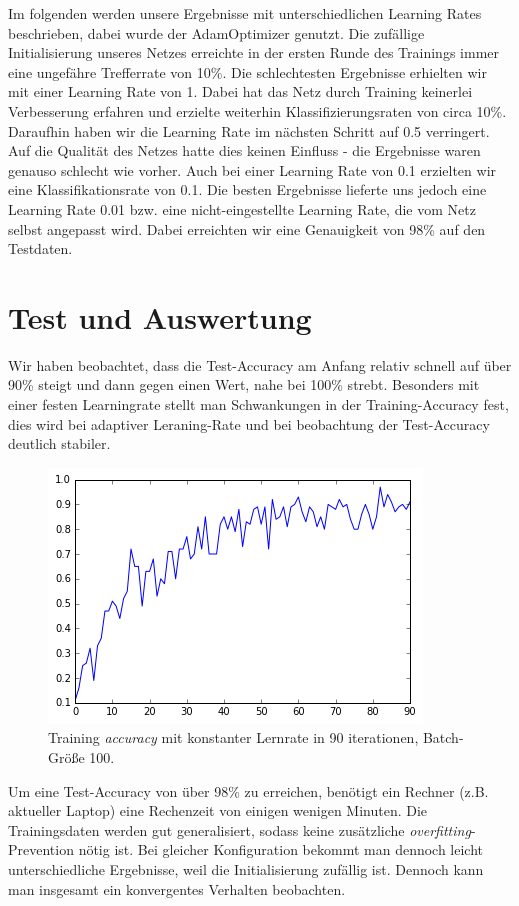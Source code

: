 \documentclass[10pt,journal,compsoc]{IEEEtran}
\begin{document}
\noindent Im folgenden werden unsere Ergebnisse mit unterschiedlichen Learning Rates beschrieben, dabei wurde der AdamOptimizer genutzt.
Die zufällige Initialisierung unseres Netzes erreichte in der ersten Runde des Trainings immer eine ungefähre Trefferrate von 10\%.
Die schlechtesten Ergebnisse erhielten wir mit einer Learning Rate von 1. Dabei hat das Netz durch Training keinerlei Verbesserung erfahren und erzielte weiterhin Klassifizierungsraten von circa 10\%.\\

\noindent Daraufhin haben wir die Learning Rate im nächsten Schritt auf 0.5 verringert. Auf die Qualität des Netzes hatte dies keinen Einfluss - die Ergebnisse waren genauso schlecht wie vorher.
Auch bei einer Learning Rate von 0.1 erzielten wir eine Klassifikationsrate von 0.1.
Die besten Ergebnisse lieferte uns jedoch eine Learning Rate 0.01 bzw. eine nicht-eingestellte Learning Rate, die vom Netz selbst angepasst wird. Dabei erreichten wir eine Genauigkeit von 98\% auf den Testdaten.

\section{Test und Auswertung}
Wir haben beobachtet, dass die Test-Accuracy am Anfang relativ schnell auf über 90\% steigt und dann gegen einen Wert, nahe bei 100\% strebt. Besonders mit einer festen Learningrate stellt man Schwankungen in der Training-Accuracy fest, dies wird bei adaptiver Leraning-Rate und bei beobachtung der Test-Accuracy deutlich stabiler.
\begin{figure}[!h]
\centering
\includegraphics[scale=0.5]{accuracy_90_iterations_fixed_learning_rate}
\caption{Training \emph{accuracy} mit konstanter Lernrate in 90 iterationen, Batch-Größe 100.}
\end{figure}

Um eine Test-Accuracy von über 98\% zu erreichen, benötigt ein Rechner (z.B. aktueller Laptop) eine Rechenzeit von einigen wenigen Minuten. Die Trainingsdaten werden gut generalisiert, sodass keine zusätzliche \emph{overfitting}-Prevention nötig ist. Bei gleicher Konfiguration bekommt man dennoch leicht unterschiedliche Ergebnisse, weil die Initialisierung zufällig ist. Dennoch kann man insgesamt ein konvergentes Verhalten beobachten.
\end{document}
